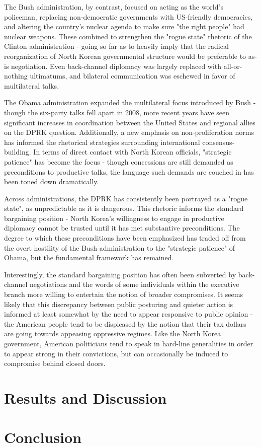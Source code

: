 \documentclass{article}
\begin{document}
The Bush administration, by contrast, focused on acting as the world's policeman, replacing non-democratic governments with US-friendly democracies, and altering the country's nuclear agenda to make sure "the right people" had nuclear weapons. These combined to strengthen the "rogue state" rhetoric of the Clinton administration - going so far as to heavily imply that the radical reorganization of North Korean governmental structure would be preferable to as-is negotiation. Even back-channel diplomacy was largely replaced with all-or-nothing ultimatums, and bilateral communication was eschewed in favor of multilateral talks.

The Obama administration expanded the multilateral focus introduced by Bush - though the six-party talks fell apart in 2008, more recent years have seen significant increases in coordination between the United States and regional allies on the DPRK question. Additionally, a new emphasis on non-proliferation norms has informed the rhetorical strategies surrounding international consensus-building. In terms of direct contact with North Korean officials, "strategic patience" has become the focus - though concessions are still demanded as preconditions to productive talks, the language such demands are couched in has been toned down dramatically.

Across administrations, the DPRK has consistently been portrayed as a "rogue state", as unpredictable as it is dangerous. This rhetoric informs the standard bargaining position - North Korea's willingness to engage in productive diplomacy cannot be trusted until it has met substantive preconditions. The degree to which these preconditions have been emphasized has traded off from the overt hostility of the Bush administration to the "strategic patience" of Obama, but the fundamental framework has remained. 

Interestingly, the standard bargaining position has often been subverted by back-channel negotiations and the words of some individuals within the executive branch more willing to entertain the notion of broader compromises. It seems likely that this discrepancy between public posturing and quieter action is informed at least somewhat by the need to appear responsive to public opinion - the American people tend to be displeased by the notion that their tax dollars are going towards appeasing oppressive regimes. Like the North Korea government, American politicians tend to speak in hard-line generalities in order to appear strong in their convictions, but can occasionally be induced to compromise behind closed doors.

\section{Results and Discussion}

\section{Conclusion}




\todos
\end{document}
